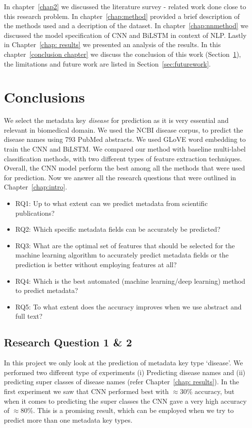 In chapter~\ref{chap2} we discussed the literature survey - related work done close to this research problem. In chapter~\ref{chap:method} provided a brief description of the methods used and a decription of the dataset. In chapter~\ref{chap:nnmethod} we discussed the model specification of CNN and BiLSTM in context of NLP.  Lastly in Chapter~\ref{chap: results} we presented an analysis of the results. In this chapter~\ref{conclusion chapter} we discuss the conclusion of this work (Section~\ref{sec:conclusion}), the limitations and future work are listed in Section~\ref{sec:futurework}. 

\section{Conclusions}\label{sec:conclusion}
We select the metadata key \emph{disease} for prediction as it is very essential and relevant in biomedical domain. We used the NCBI disease corpus, to predict the disease names using 793 PubMed abstracts. We used GLoVE word embedding to train the CNN and BiLSTM. We compared our method with baseline multi-label classification methods, with two different types of feature extraction techniques. Overall, the CNN model perform the best among all the methods that were used for prediction. Now we answer all the research questions that were outlined in Chapter~\ref{chap:intro}.
\begin{itemize}
    \item RQ1: Up to what extent can we predict metadata from scientific publications?
    \item RQ2: Which specific metadata fields can be accurately be predicted?
    \item RQ3: What are the optimal set of features that should be selected for the machine learning algorithm to accurately predict metadata fields or the prediction is better without employing features at all?
    \item RQ4: Which is the best automated (machine learning/deep learning) method to predict metadata?
    \item RQ5: To what extent does the accuracy improves when we use abstract and full text?
\end{itemize}

\subsection{Research Question 1 \& 2}
In this project we only look at the prediction of metadata key type `disease'. We performed two different type of experiments (i) Predicting disease names and (ii) predicting super classes of disease names (refer Chapter~\ref{chap: results}). In the first experiment we saw that CNN performed best with $\approx$30\% accuracy, but when it comes to predicting the super classes the CNN gave a very high accuracy of $\approx$80\%. This is a promising result, which can be employed when we try to predict more than one metadata key types. 

